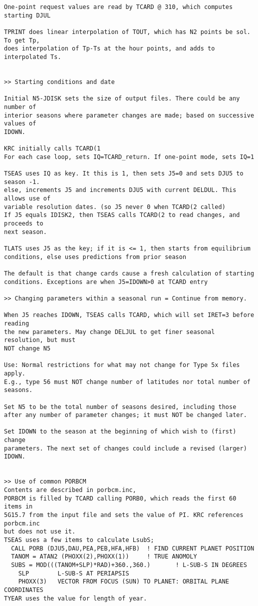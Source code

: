 \begin{verbatim}
One-point request values are read by TCARD @ 310, which computes starting DJUL

TPRINT does linear interpolation of TOUT, which has N2 points be sol. To get Tp,
does interpolation of Tp-Ts at the hour points, and adds to interpolated Ts.
 

>> Starting conditions and date

Initial N5-JDISK sets the size of output files. There could be any number of
interior seasons where parameter changes are made; based on successive values of
IDOWN.

KRC initially calls TCARD(1
For each case loop, sets IQ=TCARD_return. If one-point mode, sets IQ=1

TSEAS uses IQ as key. It this is 1, then sets J5=0 and sets DJU5 to season -1.
else, increments J5 and increments DJU5 with current DELDUL. This allows use of
variable resolution dates. (so J5 never 0 when TCARD(2 called)
If J5 equals IDISK2, then TSEAS calls TCARD(2 to read changes, and proceeds to 
next season. 

TLATS uses J5 as the key; if it is <= 1, then starts from equilibrium
conditions, else uses predictions from prior season

The default is that change cards cause a fresh calculation of starting
conditions. Exceptions are when J5=IDOWN>0 at TCARD entry

>> Changing parameters within a seasonal run = Continue from memory.

When J5 reaches IDOWN, TSEAS calls TCARD, which will set IRET=3 before reading
the new parameters. May change DELJUL to get finer seasonal resolution, but must
NOT change N5

Use: Normal restrictions for what may not change for Type 5x files apply.
E.g., type 56 must NOT change number of latitudes nor total number of seasons.

Set N5 to be the total number of seasons desired, including those
after any number of parameter changes; it must NOT be changed later.

Set IDOWN to the season at the beginning of which wish to (first) change
parameters. The next set of changes could include a revised (larger) IDOWN.


>> Use of common PORBCM
Contents are described in porbcm.inc, 
PORBCM is filled by TCARD calling PORB0, which reads the first 60 items in 
5G15.7 from the input file and sets the value of PI. KRC references porbcm.inc 
but does not use it. 
TSEAS uses a few items to calculate LsubS; 
  CALL PORB (DJU5,DAU,PEA,PEB,HFA,HFB)  ! FIND CURRENT PLANET POSITION 
  TANOM = ATAN2 (PHOXX(2),PHOXX(1))     ! TRUE ANOMOLY
  SUBS = MOD(((TANOM+SLP)*RAD)+360.,360.)       ! L-SUB-S IN DEGREES
    SLP        L-SUB-S AT PERIAPSIS
    PHOXX(3)   VECTOR FROM FOCUS (SUN) TO PLANET: ORBITAL PLANE COORDINATES
TYEAR uses the value for length of year.





\end{verbatim}
